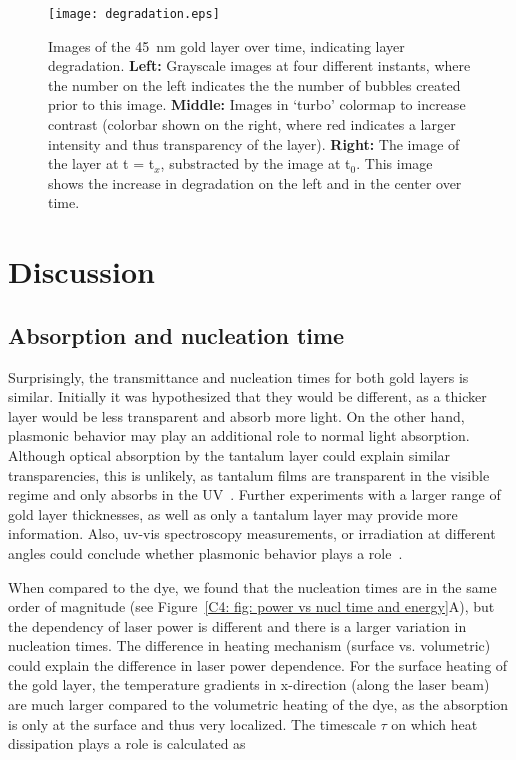 \documentclass[11pt]{article}
\begin{document}
\begin{figure}[t!]
	\texttt{[image: degradation.eps]}
	\centering
	\captionsetup{width=\linewidth}
	\caption{Images of the 45~nm gold layer over time, indicating layer degradation. \textbf{Left:} Grayscale images at four different instants, where the number on the left indicates the the number of bubbles created prior to this image. \textbf{Middle:} Images in `turbo' colormap to increase contrast (colorbar shown on the right, where red indicates a larger intensity and thus transparency of the layer). \textbf{Right:} The image of the layer at t = t$_x$, substracted by the image at t$_0$. This image shows the increase in degradation on the left and in the center over time.}
	\label{C4: fig: Degradation}
\end{figure} 


\section{Discussion}
\subsection{Absorption and nucleation time}
Surprisingly, the transmittance and nucleation times for both gold layers is similar. Initially it was hypothesized that they would be different, as a thicker layer would be less transparent and absorb more light. On the other hand, plasmonic behavior may play an additional role to normal light absorption. Although optical absorption by the tantalum layer could explain similar transparencies, this is unlikely, as tantalum films are transparent in the visible regime and only absorbs in the UV~\cite{Hirpara2022,Graven1961}. Further experiments with a larger range of gold layer thicknesses, as well as only a tantalum layer may provide more information. Also, uv-vis spectroscopy measurements, or irradiation at different angles could conclude whether plasmonic behavior plays a role~\cite{Brockman2000}.

When compared to the dye, we found that the nucleation times are in the same order of magnitude (see Figure~\ref{C4: fig: power vs nucl time and energy}A), but the dependency of laser power is different and there is a larger variation in nucleation times. The difference in heating mechanism (surface vs. volumetric) could explain the difference in laser power dependence. For the surface heating of the gold layer, the temperature gradients in x-direction (along the laser beam) are much larger compared to the volumetric heating of the dye, as the absorption is only at the surface and thus very localized. The timescale $\tau$ on which heat dissipation plays a role is calculated as
\end{document}
